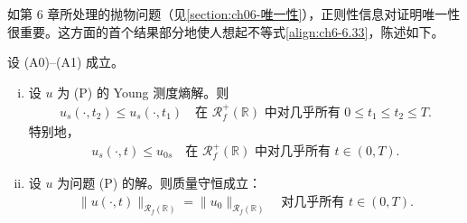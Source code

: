 \documentclass[../../main.tex]{subfiles}%
\begin{document}
如第 6 章所处理的抛物问题（见\cref{section:ch06-唯一性}），正则性信息对证明唯一性很重要。这方面的首个结果部分地使人想起不等式\eqref{align:ch6-6.33}，陈述如下。

\begin{proposition}\label{proposition:ch07-7.1.2}
设 (A0)--(A1) 成立。
\begin{enumerate}[(i)]
\item 设 $u$ 为 (P) 的 Young 测度熵解。则
\begin{align}
u_s(\cdot,t_2)\leqslant u_s(\cdot,t_1)\quad\text{在 }\mathscr{R}_f^+(\mathbb{R})\text{ 中对几乎所有 }0\leqslant t_1\leqslant t_2\leqslant T. \label{align:ch07-7.15}
\end{align}
特别地，
\begin{align}
u_s(\cdot,t)\leqslant u_{0s}\quad\text{在 }\mathscr{R}_f^+(\mathbb{R})\text{ 中对几乎所有 }t\in(0,T). \label{align:ch07-7.16}
\end{align}
\item 设 $u$ 为问题 (P) 的解。则质量守恒成立：
\begin{align}
\|u(\cdot,t)\|_{\mathscr{R}_f(\mathbb{R})}=\|u_0\|_{\mathscr{R}_f(\mathbb{R})}
\quad\text{对几乎所有 }t\in(0,T). \label{align:ch07-7.17}
\end{align}
\end{enumerate}
\end{proposition}
\end{document}
